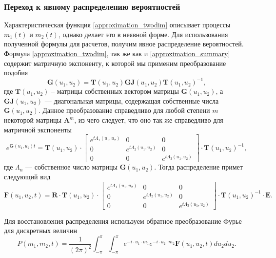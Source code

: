 \subsubsection{Переход к явному распределению вероятностей} \label{distr_find_twodim}
Характеристическая функция \eqref{approximation_twodim} описывает процессы $m_{1}(t)$ и $m_{2}(t)$, однако делает это в неявной форме. Для использования полученной формулы для расчетов, получим явное распределение вероятностей.
Формула \eqref{approximation_twodim}, так же как и \eqref{approximation_summary} содержит матричную экспоненту, к которой мы применим преобразование подобия \cite{bronson1991matrix}
\begin{equation*}
	\boldsymbol{G}(u_{1},u_{2}) =\boldsymbol{T}(u_{1},u_{2})\boldsymbol{GJ}(u_{1},u_{2})\boldsymbol{T}(u_{1},u_{2})^{-1},
\end{equation*}
где $\boldsymbol{T}(u_{1},u_{2})$ – матрицы собственных вектором матрицы $\boldsymbol{G}(u_{1},u_{2})$, а $\boldsymbol{GJ}(u_{1},u_{2})$ --- диагональная матрицы, содержащая собственные числа $\boldsymbol{G}(u_{1},u_{2})$. Данное преобразование справедливо для любой степени $m$ некоторой матрицы $\boldsymbol{A}^{m}$, из чего следует, что оно так же справедливо для матричной экспоненты \cite{egorov2006prog}
\begin{equation*}
	e^{\boldsymbol{G}(u_{1},u_{2})t}=\boldsymbol{T}(u_{1},u_{2})\cdot \begin{bmatrix}
		e^{t \Lambda_{1}(u_{1},u_{2})} & 0 &  0\\
		0 & e^{t \Lambda_{2}(u_{1},u_{2})} & 0\\
		0 & 0 &	e^{t \Lambda_{3}(u_{1},u_{2})}
	\end{bmatrix} \cdot \boldsymbol{T}(u_{1},u_{2})^{-1},
\end{equation*}
где $\Lambda_{n}$ --- собственное число матрицы $\boldsymbol{G}(u_{1},u_{2})$. Тогда распределение примет следующий вид
\begin{equation*}
	\boldsymbol{F}(u_{1},u_{2},t)=\boldsymbol{R} \cdot \boldsymbol{T}(u_{1},u_{2})\cdot \begin{bmatrix}
		e^{t \Lambda_{1}(u_{1},u_{2})} & 0 &  0\\
		0 & e^{t \Lambda_{2}(u_{1},u_{2})} & 0\\
		0 & 0 &	e^{t \Lambda_{3}(u_{1},u_{2})}
	\end{bmatrix} \cdot \boldsymbol{T}(u_{1},u_{2})^{-1} \cdot \boldsymbol{E}.
\end{equation*}

Для восстановления распределения используем обратное преобразование Фурье для дискретных величин
\begin{equation} \label{distr_simple_twodim}
	P(m_{1},m_{2},t) = \dfrac{1}{(2\pi)^2}\int_{-\pi}^{\pi}\int_{-\pi}^{\pi} e^{-i \cdot u_{1} \cdot m_{1}} e^{-i \cdot u_{2} \cdot m_{2}}\boldsymbol{F}(u_{1},u_{2},t)du_{2}du_{2}.
\end{equation}

